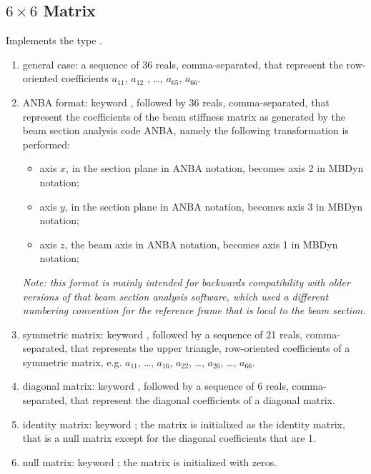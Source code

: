 \subsection{$6 \times 6$ Matrix}
\label{sec:Mat6x6}
Implements the type .
\begin{enumerate}
    \item general case: a sequence of 36 reals, comma-separated, that
    represent the row-oriented coefficients $ a_{11} $, $ a_{12}$ ,
    \ldots, $ a_{65} $, $ a_{66} $.
    \item ANBA format: keyword , followed by 36 reals, 
    comma-separated, that represent the coefficients of the beam stiffness
    matrix as generated by the beam section analysis code ANBA,
    namely the following transformation is performed:
    \begin{itemize}
        \item axis $ x $, in the section plane in ANBA notation, 
	becomes axis 2 in MBDyn notation;    
	\item axis $ y $, in the section plane in ANBA notation, 
	becomes axis 3 in MBDyn notation;    
	\item axis $ z $, the beam axis in ANBA notation, 
	becomes axis 1 in MBDyn notation;    
    \end{itemize}
    \emph{Note: this format is mainly intended for backwards compatibility
    with older versions of that beam section analysis software,
    which used a different numbering convention for the reference frame
    that is local to the beam section.}
    \item symmetric matrix: keyword , followed by a sequence
    of 21 reals, comma-separated, that represents the upper triangle,
    row-oriented coefficients of a symmetric matrix, 
    e.g. $ a_{11} $, \ldots , $ a_{16} $, $ a_{22} $,
    \ldots , $ a_{26} $, \ldots, $ a_{66} $.
    \item diagonal matrix: keyword , followed by a sequence
    of 6 reals, comma-separated, that represent the diagonal coefficients 
    of a diagonal matrix.
    \item identity matrix: keyword ; the matrix is initialized
    as the identity matrix, that is a null matrix except for the diagonal 
    coefficients that are 1.
    \item null matrix: keyword ; the matrix is initialized 
    with zeros.
\end{enumerate}
